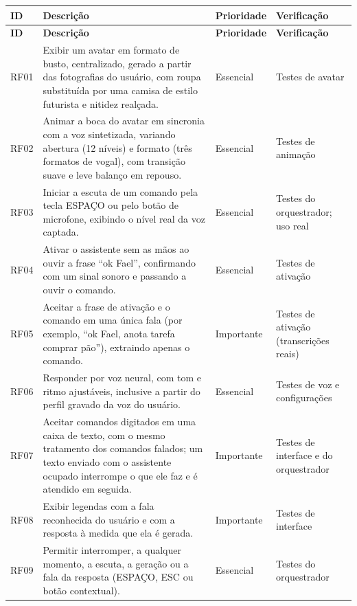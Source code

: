 \begin{singlespace}
\label{qua:rf-interacao}
\small
\begin{tabularx}{\textwidth}{|C{1.25cm}|L|C{2.0cm}|P{3.2cm}|}
\hline
\textbf{ID} & \textbf{Descrição} & \textbf{Prioridade} & \textbf{Verificação} \\ \hline
\endfirsthead
\hline
\textbf{ID} & \textbf{Descrição} & \textbf{Prioridade} & \textbf{Verificação} \\ \hline
\endhead
RF01 & Exibir um avatar em formato de busto, centralizado, gerado a partir das fotografias do usuário, com
       roupa substituída por uma camisa de estilo futurista e nitidez realçada. & Essencial & Testes de avatar \\ \hline
RF02 & Animar a boca do avatar em sincronia com a voz sintetizada, variando abertura (12 níveis) e
       formato (três formatos de vogal), com transição suave e leve balanço em repouso. & Essencial & Testes de animação \\ \hline
RF03 & Iniciar a escuta de um comando pela tecla ESPAÇO ou pelo botão de microfone, exibindo o nível
       real da voz captada. & Essencial & Testes do orquestrador; uso real \\ \hline
RF04 & Ativar o assistente sem as mãos ao ouvir a frase “ok Fael”, confirmando com um sinal sonoro e
       passando a ouvir o comando. & Essencial & Testes de ativação \\ \hline
RF05 & Aceitar a frase de ativação e o comando em uma única fala (por exemplo, “ok Fael, anota tarefa
       comprar pão”), extraindo apenas o comando. & Importante & Testes de ativação (transcrições reais) \\ \hline
RF06 & Responder por voz neural, com tom e ritmo ajustáveis, inclusive a partir do perfil gravado da
       voz do usuário. & Essencial & Testes de voz e configurações \\ \hline
RF07 & Aceitar comandos digitados em uma caixa de texto, com o mesmo tratamento dos comandos falados; um texto
       enviado com o assistente ocupado interrompe o que ele faz e é atendido em seguida. & Importante & Testes de interface e do orquestrador \\ \hline
RF08 & Exibir legendas com a fala reconhecida do usuário e com a resposta à medida que ela é gerada. & Importante & Testes de interface \\ \hline
RF09 & Permitir interromper, a qualquer momento, a escuta, a geração ou a fala da resposta (ESPAÇO, ESC
       ou botão contextual). & Essencial & Testes do orquestrador \\ \hline

\end{tabularx}
\end{singlespace}
